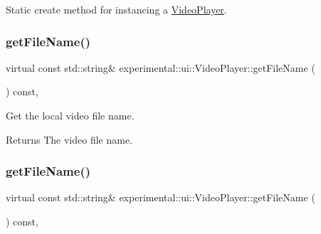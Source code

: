 Static create method for instancing a \hyperlink{classexperimental_1_1ui_1_1VideoPlayer}{Video\+Player}. \mbox{\label{classexperimental_1_1ui_1_1VideoPlayer_a82c2ba3d951b67d69420a83cd615d8b5}} 
\subsubsection{\texorpdfstring{get\+File\+Name()}{getFileName()}\hspace{0.1cm}{\footnotesize\ttfamily [1/2]}}
{\footnotesize\ttfamily virtual const std\+::string\& experimental\+::ui\+::\+Video\+Player\+::get\+File\+Name (\begin{DoxyParamCaption}{ }\end{DoxyParamCaption}) const\hspace{0.3cm}{\ttfamily [inline]}, {\ttfamily [virtual]}}



Get the local video file name. 

\begin{DoxyReturn}{Returns}
The video file name. 
\end{DoxyReturn}
\mbox{\label{classexperimental_1_1ui_1_1VideoPlayer_a82c2ba3d951b67d69420a83cd615d8b5}} 
\subsubsection{\texorpdfstring{get\+File\+Name()}{getFileName()}\hspace{0.1cm}{\footnotesize\ttfamily [2/2]}}
{\footnotesize\ttfamily virtual const std\+::string\& experimental\+::ui\+::\+Video\+Player\+::get\+File\+Name (\begin{DoxyParamCaption}{ }\end{DoxyParamCaption}) const\hspace{0.3cm}{\ttfamily [inline]}, {\ttfamily [virtual]}}



